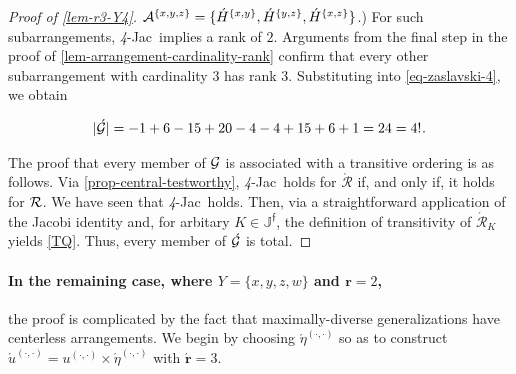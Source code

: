 \documentclass[12pt,a4paper,twoside]{article}
\newcommand{\novel}{\mathfrak f}
\newcommand{\ext}{\mathrel{\mc R}}
\newcommand{\aext}{\mathrel{\acute{\mathrel{\mathcal R}}}}
\newcommand{\mbbjp}{{\mathds {J}^{\novel}}}
\newcommand{\dd}{{(\cdot,\cdot)}}
\newcommand{\fourjac}{\textup{\textit{4}-Jac}}
\begin{document}
\begin{appendices}
\begin{proof}[Proof of \cref{lem-r3-Y4}]
$\mathcal A^{\{x,y,z\}} =
\{\acute{H}^{\{x,y\}},\acute{H}^{\{y,z\}},\acute{H}^{\{x,z\}}\}$.)  For such
subarrangements, \fourjac\ implies a rank of $2$. Arguments from the final step
in the proof of \cref{lem-arrangement-cardinality-rank} confirm that every other
subarrangement with cardinality $3$ has rank $3$.  Substituting into
\cref{eq-zaslavski-4}, we obtain
\begin{linenomath*}
  \begin{equation*}
    \begin{aligned}
    \lvert  \acute{ \mathcal G} \rvert =
    -1+6-15+20-4-4+15+6+1=24 = 4!\hskip.5pt.
   \end{aligned}
 \end{equation*}
\end{linenomath*}
 The proof that every member of $\mathcal G$ is associated with a transitive ordering
 is as follows. Via \cref{prop-central-testworthy}, \fourjac\ holds for $\aext$
 if, and only if, it holds for $\ext$. We have seen that \fourjac\ holds. Then,
 via a straightforward application of the Jacobi identity and, for arbitary
 $K \in \mbbjp$, the definition of transitivity of $\aext_{K}$ yields
 \ref{TQ}. Thus, every member of $\acute{\mathcal G}$ is total.
  \end{proof}

  \paragraph{In the remaining case, where $Y = \{x,y,z,w\}$ and
    $\mathbf r = 2$,\hskip-8pt}
 the proof is complicated by the fact that maximally-diverse {generalization}s have centerless
 arrangements.
 We begin by choosing $\acute{\eta}^{\dd}$ so as to construct
 $\acute{u}^{\dd} = u^{\dd} \times \acute{\eta}^{\dd}$ with $\acute{\mathbf r} = 3$.


\end{appendices}
\end{document}

